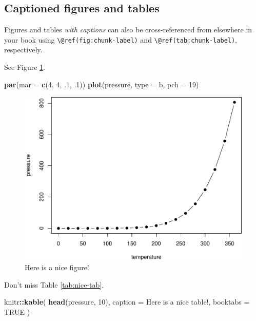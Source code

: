 \documentclass[
]{book}
\newenvironment{Shaded}{\begin{snugshade}}{\end{snugshade}}
\newcommand{\AttributeTok}[1]{\textcolor[rgb]{0.13,0.29,0.53}{#1}}
\newcommand{\ConstantTok}[1]{\textcolor[rgb]{0.56,0.35,0.01}{#1}}
\newcommand{\DecValTok}[1]{\textcolor[rgb]{0.00,0.00,0.81}{#1}}
\newcommand{\FunctionTok}[1]{\textcolor[rgb]{0.13,0.29,0.53}{\textbf{#1}}}
\newcommand{\NormalTok}[1]{#1}
\newcommand{\SpecialCharTok}[1]{\textcolor[rgb]{0.81,0.36,0.00}{\textbf{#1}}}
\newcommand{\StringTok}[1]{\textcolor[rgb]{0.31,0.60,0.02}{#1}}
\theoremstyle{definition}
\theoremstyle{definition}
\theoremstyle{definition}
\theoremstyle{definition}
\theoremstyle{remark}
\begin{document}
\hypertarget{captioned-figures-and-tables}{%
\subsection{Captioned figures and tables}\label{captioned-figures-and-tables}}

Figures and tables \emph{with captions} can also be cross-referenced from elsewhere in your book using \texttt{\textbackslash{}@ref(fig:chunk-label)} and \texttt{\textbackslash{}@ref(tab:chunk-label)}, respectively.

See Figure \ref{fig:nice-fig}.

\begin{Shaded}
\begin{Highlighting}[]
\FunctionTok{par}\NormalTok{(}\AttributeTok{mar =} \FunctionTok{c}\NormalTok{(}\DecValTok{4}\NormalTok{, }\DecValTok{4}\NormalTok{, .}\DecValTok{1}\NormalTok{, .}\DecValTok{1}\NormalTok{))}
\FunctionTok{plot}\NormalTok{(pressure, }\AttributeTok{type =} \StringTok{\textquotesingle{}b\textquotesingle{}}\NormalTok{, }\AttributeTok{pch =} \DecValTok{19}\NormalTok{)}
\end{Highlighting}
\end{Shaded}

\begin{figure}

{\centering \includegraphics[width=0.8\linewidth]{_main_files/figure-latex/nice-fig-1} 

}

\caption{Here is a nice figure!}\label{fig:nice-fig}
\end{figure}

Don't miss Table \ref{tab:nice-tab}.

\begin{Shaded}
\begin{Highlighting}[]
\NormalTok{knitr}\SpecialCharTok{::}\FunctionTok{kable}\NormalTok{(}
  \FunctionTok{head}\NormalTok{(pressure, }\DecValTok{10}\NormalTok{), }\AttributeTok{caption =} \StringTok{\textquotesingle{}Here is a nice table!\textquotesingle{}}\NormalTok{,}
  \AttributeTok{booktabs =} \ConstantTok{TRUE}
\NormalTok{)}
\end{Highlighting}
\end{Shaded}
\end{document}

